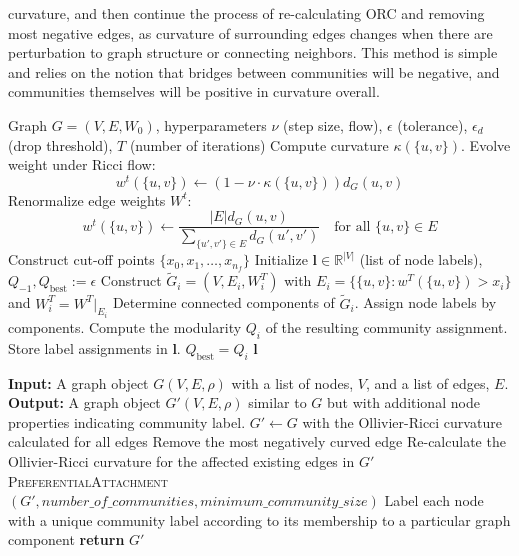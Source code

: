 \documentclass{Dissertate}
\theoremstyle{definition}
\theoremstyle{definition} %
\theoremstyle{definition}
\begin{document}
curvature, and then continue the process of re-calculating ORC and removing most negative edges, as curvature of surrounding edges changes when there are perturbation to graph structure or connecting neighbors. This method is simple and relies on the notion that bridges between communities will be negative, and communities themselves will be positive in curvature overall. 



\singlespacing
\begin{algorithm}[H]
\caption{Curvature-based Clustering via Ricci Flow from \cite{TianYu2023CCoG}}
\begin{algorithmic}[1]
\Require Graph $G = (V, E, W_0)$, hyperparameters $\nu$ (step size, flow), $\epsilon$ (tolerance), $\epsilon_d$ (drop threshold), $T$ (number of iterations)
        \State Compute curvature $\kappa(\{u,v\})$.
        \State Evolve weight under Ricci flow: 
        \[
        w^t(\{u,v\}) \leftarrow (1 - \nu \cdot \kappa(\{u,v\})) d_G(u,v)
        \]
    \EndFor
    \State Renormalize edge weights $W^t$: 
    \[
    w^t(\{u,v\}) \leftarrow \frac{|E| d_G(u,v)}{\sum_{\{u',v'\} \in E} d_G(u',v')}
    \quad \text{for all } \{u,v\} \in E
    \]
\EndFor
\State Construct cut-off points $\{x_0, x_1, \ldots, x_{n_f}\}$
\State Initialize $\mathbf{l} \in \mathbb{R}^{|V|}$ (list of node labels), $Q_{-1}, Q_{\text{best}} := \epsilon$
    \State Construct $\tilde{G}_i = (V, E_i, W^T_i)$ with $E_i = \{\{u,v\} : w^T(\{u,v\}) > x_i\}$ and $W^T_i = W^T|_{E_i}$
    \State Determine connected components of $\tilde{G}_i$. Assign node labels by components.
    \State Compute the modularity $Q_i$ of the resulting community assignment.
        \State Store label assignments in $\mathbf{l}$. $Q_{\text{best}} = Q_i$
    \EndIf
\EndFor
{}
    \Return $\mathbf{l}$
\EndIf
\end{algorithmic}
\end{algorithm}

\begin{algorithm}
\caption{Ollivier-Ricci Curvature based method for Community Detection from \cite{SiaJayson2019OCMt}}
\begin{algorithmic}[1]
\State \textbf{Input:} A graph object $G(V, E, \rho)$ with a list of nodes, $V$, and a list of edges, $E$.
\State \textbf{Output:} A graph object $G'(V, E, \rho)$ similar to $G$ but with additional node properties indicating community label.
\State $G' \gets G$ with the Ollivier-Ricci curvature calculated for all edges
    \State Remove the most negatively curved edge
    \State Re-calculate the Ollivier-Ricci curvature for the affected existing edges in $G'$
\EndWhile
\State \textsc{PreferentialAttachment}$(G', \textit{number\_of\_communities}, \textit{minimum\_community\_size})$
\State Label each node with a unique community label according to its membership to a particular graph component
\State \textbf{return} $G'$
\end{algorithmic}
\end{algorithm}
\end{document}
